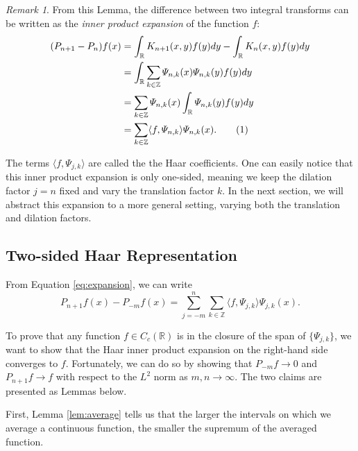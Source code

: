 \documentclass[11pt]{amsart}
\theoremstyle{theorem} %
\theoremstyle{definition}
\theoremstyle{example}
\theoremstyle{remark}
\newtheorem{rem}[thm]{Remark}
\numberwithin{equation}{section}
\newcommand{\R}{\mathbb{R}}
\newcommand{\Z}{\mathbb{Z}}
\newcommand\numberthis{\addtocounter{equation}{1}\tag{\theequation}}
\begin{document}
\vspace{8pt}
\begin{rem}
	From this Lemma, the difference between two integral transforms can be written as the \textit{inner product expansion} of the function $ f $:
	\begin{align*}
	(P_{n+1} - P_n) f(x) &= \int_{\R} K_{n+1}(x,y)f(y)dy - \int_{\R} K_{n}(x,y)f(y)dy \\
	&= \int_{\R} \sum_{k \in \Z} \varPsi_{n,k}(x) \varPsi_{n,k}(y) f(y) dy \\
	&= \sum_{k \in \Z} \varPsi_{n,k}(x) \int_{\R} \varPsi_{n,k}(y) f(y) dy \\
	&= \sum_{k \in \Z} \langle f, \varPsi_{n,k} \rangle \varPsi_{n,k}(x).  \numberthis \label{eq:expansion}
	\end{align*}
	
	The terms $ \langle f, \varPsi_{j,k} \rangle $ are called the the Haar coefficients.
	One can easily notice that this inner product expansion is only one-sided, meaning we keep the dilation factor $ j = n $ fixed and vary the translation factor $ k $. In the next section, we will abstract this expansion to a more general setting, varying both the translation and dilation factors.
\end{rem}


\subsection{Two-sided Haar Representation} \label{subsec:two-sided}
From Equation \ref{eq:expansion}, we can write
\begin{equation} \label{eq:twosided}
	P_{n+1}f(x) - P_{-m}f(x) = \sum_{j=-m}^{n} \sum_{k \in \Z} \langle f, \varPsi_{j,k} \rangle \varPsi_{j,k}(x).
\end{equation}

To prove that any function $ f \in C_c(\R) $ is in the closure of the span of $ \{ \varPsi_{j,k} \} $, we want to show that the Haar inner product expansion on the right-hand side converges to $ f $. Fortunately, we can do so by showing that $ P_{-m}f \to 0 $ and $ P_{n+1}f \to f $ with respect to the $ L^2 $ norm as $ m, n \to \infty $. The two claims are presented as Lemmas below.

\vspace{8pt}
First, Lemma \ref{lem:average} tells us that the larger the intervals on which we average a continuous function, the smaller the supremum of the averaged function.
\end{document}
